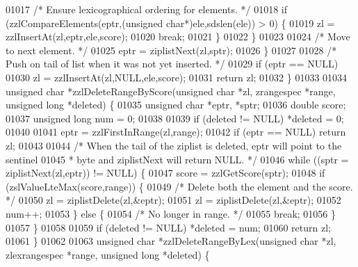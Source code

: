 \begin{DoxyCode}
01017             \textcolor{comment}{/* Ensure lexicographical ordering for elements. */}
01018             \textcolor{keywordflow}{if} (zzlCompareElements(eptr,(\textcolor{keywordtype}{unsigned} \textcolor{keywordtype}{char}*)ele,sdslen(ele)) > 0) \{
01019                 zl = zzlInsertAt(zl,eptr,ele,score);
01020                 \textcolor{keywordflow}{break};
01021             \}
01022         \}
01023 
01024         \textcolor{comment}{/* Move to next element. */}
01025         eptr = ziplistNext(zl,sptr);
01026     \}
01027 
01028     \textcolor{comment}{/* Push on tail of list when it was not yet inserted. */}
01029     \textcolor{keywordflow}{if} (eptr == NULL)
01030         zl = zzlInsertAt(zl,NULL,ele,score);
01031     \textcolor{keywordflow}{return} zl;
01032 \}
01033 
01034 \textcolor{keywordtype}{unsigned} \textcolor{keywordtype}{char} *zzlDeleteRangeByScore(\textcolor{keywordtype}{unsigned} \textcolor{keywordtype}{char} *zl, zrangespec *range, \textcolor{keywordtype}{unsigned} \textcolor{keywordtype}{long} *deleted) \{
01035     \textcolor{keywordtype}{unsigned} \textcolor{keywordtype}{char} *eptr, *sptr;
01036     \textcolor{keywordtype}{double} score;
01037     \textcolor{keywordtype}{unsigned} \textcolor{keywordtype}{long} num = 0;
01038 
01039     \textcolor{keywordflow}{if} (deleted != NULL) *deleted = 0;
01040 
01041     eptr = zzlFirstInRange(zl,range);
01042     \textcolor{keywordflow}{if} (eptr == NULL) \textcolor{keywordflow}{return} zl;
01043 
01044     \textcolor{comment}{/* When the tail of the ziplist is deleted, eptr will point to the sentinel}
01045 \textcolor{comment}{     * byte and ziplistNext will return NULL. */}
01046     \textcolor{keywordflow}{while} ((sptr = ziplistNext(zl,eptr)) != NULL) \{
01047         score = zzlGetScore(sptr);
01048         \textcolor{keywordflow}{if} (zslValueLteMax(score,range)) \{
01049             \textcolor{comment}{/* Delete both the element and the score. */}
01050             zl = ziplistDelete(zl,&eptr);
01051             zl = ziplistDelete(zl,&eptr);
01052             num++;
01053         \} \textcolor{keywordflow}{else} \{
01054             \textcolor{comment}{/* No longer in range. */}
01055             \textcolor{keywordflow}{break};
01056         \}
01057     \}
01058 
01059     \textcolor{keywordflow}{if} (deleted != NULL) *deleted = num;
01060     \textcolor{keywordflow}{return} zl;
01061 \}
01062 
01063 \textcolor{keywordtype}{unsigned} \textcolor{keywordtype}{char} *zzlDeleteRangeByLex(\textcolor{keywordtype}{unsigned} \textcolor{keywordtype}{char} *zl, zlexrangespec *range, \textcolor{keywordtype}{unsigned} \textcolor{keywordtype}{long} *deleted) \{

\end{DoxyCode}
